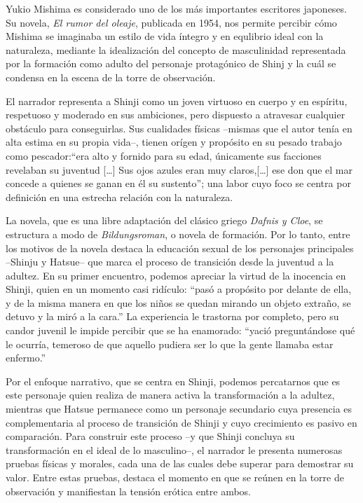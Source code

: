 Yukio Mishima es considerado uno de los más importantes escritores japoneses.
Su novela, \emph{El rumor del oleaje}, publicada en 1954, nos permite percibir cómo Mishima se imaginaba un estilo de vida íntegro y en equlibrio ideal con la naturaleza, mediante la idealización del concepto de masculinidad representada por la formación como adulto del personaje protagónico de Shinj y la cuál se condensa en la escena de la torre de observación.

El narrador representa a Shinji como un joven virtuoso en cuerpo y en espíritu, respetuoso y moderado en sus ambiciones, pero dispuesto a atravesar cualquier obstáculo para conseguirlas. Sus cualidades físicas --mismas que el autor tenía en alta estima en su propia vida--, tienen orígen y propósito en su pesado trabajo como pescador:``era alto y fornido para su edad, únicamente sus facciones revelaban su juventud [\ldots] Sus ojos azules eran muy claros,[\ldots] ese don que el mar concede a quienes se ganan en él su sustento''\autocite{mishima2006}; una labor cuyo foco se centra por definición en una estrecha relación con la naturaleza.

La novela, que es una libre adaptación del clásico griego \emph{Dafnis y Cloe}, se estructura a modo de \emph{Bildungsroman}, o novela de formación.
Por lo tanto, entre los motivos de la novela destaca la educación sexual de los personajes principales --Shinju y Hatsue-- que marca el proceso de transición desde la juventud a la adultez.
En su primer encuentro, podemos apreciar la virtud de la inocencia en Shinji, quien en un momento casi ridículo: ``pasó a propósito por delante de ella, y de la misma manera en que los niños se quedan mirando un objeto extraño, se detuvo y la miró a la cara.''\autocite{mishima2006}
La experiencia le trastorna por completo, pero su candor juvenil le impide percibir que se ha enamorado: ``yació preguntándose qué le ocurría, temeroso de que aquello pudiera ser lo que la gente llamaba estar enfermo.''\autocite{mishima2006}

Por el enfoque narrativo, que se centra en Shinji, podemos percatarnos que es este personaje quien realiza de manera activa la transformación a la adultez, mientras que Hatsue permanece como un personaje secundario cuya presencia es complementaria al proceso de transición de Shinji y cuyo crecimiento es pasivo en comparación.
Para construir este proceso --y que Shinji concluya su transformación en el ideal de lo masculino--, el narrador le presenta numerosas pruebas físicas y morales, cada una de las cuales debe superar para demostrar su valor. Entre estas pruebas, destaca el momento en que se reúnen en la torre de observación y manifiestan la tensión erótica entre ambos. 

